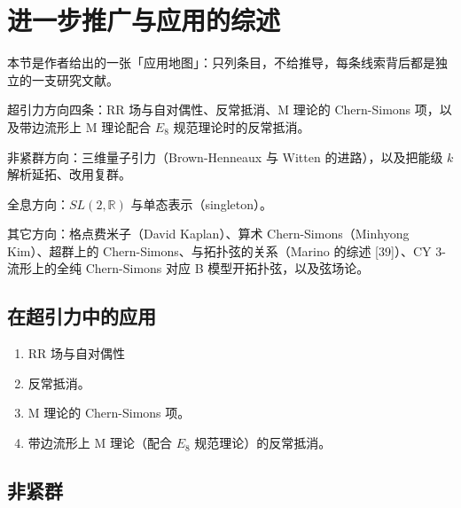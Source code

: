 \section{进一步推广与应用的综述} %

\begin{keytakeaways}
  \item 本节是作者给出的一张「应用地图」：只列条目，不给推导，每条线索背后都是独立的一支研究文献。
  \item 超引力方向四条：RR 场与自对偶性、反常抵消、M 理论的 Chern-Simons 项，以及带边流形上 M 理论配合 $E_8$ 规范理论时的反常抵消。
  \item 非紧群方向：三维量子引力（Brown-Henneaux 与 Witten 的进路），以及把能级 $k$ 解析延拓、改用复群。
  \item 全息方向：$SL(2,\mathbb{R})$ 与单态表示（singleton）。
  \item 其它方向：格点费米子（David Kaplan）、算术 Chern-Simons（Minhyong Kim）、超群上的 Chern-Simons、与拓扑弦的关系（Marino 的综述 [39]）、CY 3-流形上的全纯 Chern-Simons 对应 B 模型开拓扑弦，以及弦场论。
\end{keytakeaways}

\subsection{在超引力中的应用} %

\begin{enumerate}
  \item RR 场与自对偶性
  \item 反常抵消。
  \item M 理论的 Chern-Simons 项。
  \item 带边流形上 M 理论（配合 $E_8$ 规范理论）的反常抵消。
\end{enumerate}


\subsection{非紧群} %

